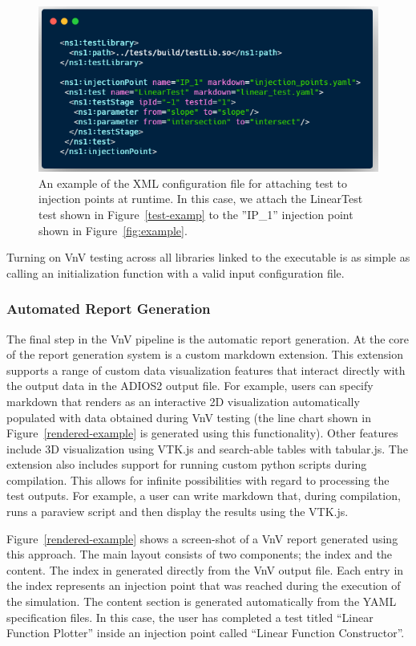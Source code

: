 \begin{figure}
\centering
 \includegraphics[width=\textwidth]{./narrative/figures/test-xml1.png}
 \caption{An example of the XML configuration file for attaching test to injection points at runtime. In this case, we attach the LinearTest test shown in Figure~\ref{test-examp} to the ''IP\_1''
 injection point shown in Figure~\ref{fig:example}. \label{test-xml}}
\end{figure}

Turning on VnV testing across all libraries linked to the executable is as simple as calling an initialization function with a valid input configuration file.

\subsubsection{Automated Report Generation}

The final step in the VnV pipeline is the automatic report generation. At the core of the report generation system is a custom markdown extension. This extension supports a range of custom data visualization features that interact directly with the output data in the ADIOS2 output file. For example, users can specify markdown that renders as an interactive 2D visualization automatically populated with data obtained during VnV testing (the line chart shown in  Figure~\ref{rendered-example} is generated using this functionality). Other features include 3D visualization using VTK.js and search-able tables with tabular.js. The extension also includes support for running custom python scripts during compilation. This allows for infinite possibilities with regard to processing the test outputs. For example, a user can write markdown that, during compilation, runs a paraview script and then display the results using the VTK.js.   

Figure~\ref{rendered-example} shows a screen-shot of a VnV report generated using this approach. The main layout consists of two components; the index and the content. The index in generated directly from the VnV output file. Each entry in the index represents an injection point that was reached during the execution of the simulation. The content section is generated automatically from the YAML specification files. In this case, the user has completed a test titled ``Linear Function Plotter'' inside an injection point called ``Linear Function Constructor''.  

